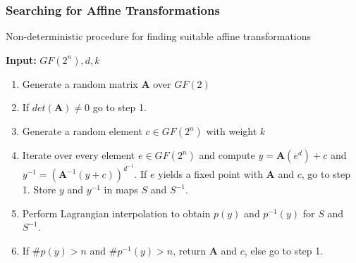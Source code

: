 \documentclass[handout,10pt]{beamer}
\begin{document}
\begin{frame}[fragile]
	\frametitle{Searching for Affine Transformations}
	Non-deterministic procedure for finding suitable affine transformations \\

	\medskip 

	\textbf{Input:} $GF(2^n), d, k$ \\
	\begin{enumerate}
		\item Generate a random matrix $\mathbf{A}$ over $GF(2)$
		\item If $det(\mathbf{A}) \not= 0$ go to step 1.
		\item Generate a random element $c \in GF(2^n)$ with weight $k$
		\item Iterate over every element $e \in GF(2^n)$ and compute $y = \mathbf{A}(e^d) + c$ and $y^{-1} = (\mathbf{A}^{-1}(y + c))^{d^{-1}}$. If $e$ yields a fixed point with $\mathbf{A}$ and $c$, go to step 1. Store $y$ and $y^{-1}$ in maps $S$ and $S^{-1}$.
		\item Perform Lagrangian interpolation to obtain $p(y)$ and $p^{-1}(y)$ for $S$ and $S^{-1}$.
		\item If $\#p(y) > n$ and $\#p^{-1}(y) > n$, return $\mathbf{A}$ and $c$, else go to step 1.
	\end{enumerate}
\end{frame}
\end{document}
